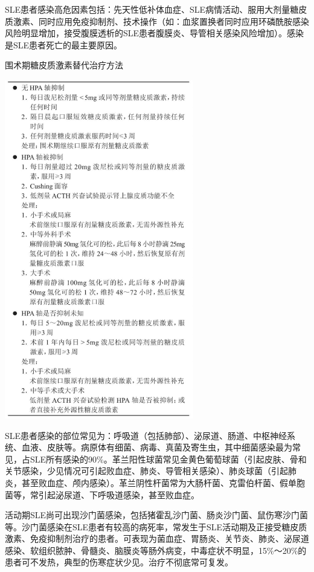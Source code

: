 SLE患者感染高危因素包括：先天性低补体血症、SLE病情活动、服用大剂量糖皮质激素、同时应用免疫抑制剂、技术操作（如：血浆置换者同时应用环磷酰胺感染风险明显增加，接受腹膜透析的SLE患者腹膜炎、导管相关感染风险增加）。感染是SLE患者死亡的最主要原因。

\begin{table}[htbp]
\centering
\caption{围术期糖皮质激素替代治疗方法}
\label{tab125-3}
\includegraphics[width=3.25in,height=5.83333in]{./images/Image00500.jpg}
\end{table}

SLE患者感染的部位常见为：呼吸道（包括肺部）、泌尿道、肠道、中枢神经系统、血液、皮肤等。病原体有细菌、病毒、真菌及寄生虫，其中细菌感染最为常见，占SLE所有感染的90\%。革兰阳性球菌常见金黄色葡萄球菌（引起皮肤、骨和关节感染，少见情况可引起败血症、肺炎、导管相关感染）、肺炎球菌（引起肺炎，甚至败血症、颅内感染）。革兰阴性杆菌常为大肠杆菌、克雷伯杆菌、假单胞菌等，常引起泌尿道、下呼吸道感染，甚至败血症。

活动期SLE尚可出现沙门菌感染，包括猪霍乱沙门菌、肠炎沙门菌、鼠伤寒沙门菌等。沙门菌感染在SLE患者有较高的病死率，常发生于SLE活动期及正接受糖皮质激素、免疫抑制剂治疗的患者。可表现为菌血症、胃肠炎、关节炎、肺炎、泌尿道感染、软组织脓肿、骨髓炎、脑膜炎等肠外病变，中毒症状不明显，15\%～20\%的患者可不发热，典型的伤寒症状少见。治疗不彻底常可复发。

